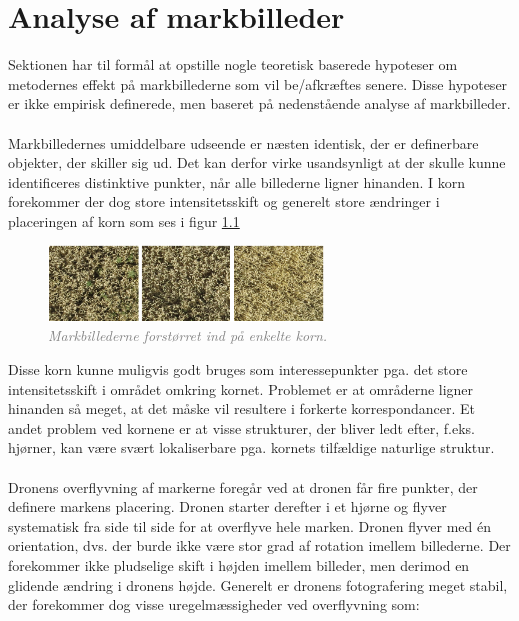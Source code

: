 \chapter{Analyse af markbilleder} \label{sec:mark}
Sektionen har til formål at opstille nogle teoretisk baserede hypoteser om metodernes effekt på markbillederne som vil be/afkræftes senere. Disse hypoteser er ikke empirisk definerede, men baseret på nedenstående analyse af markbilleder. \\ \\
Markbilledernes umiddelbare udseende er næsten identisk, der er definerbare objekter, der skiller sig ud. Det kan derfor virke usandsynligt at der skulle kunne identificeres distinktive punkter, når alle billederne ligner hinanden. I korn forekommer der dog store intensitetsskift og generelt store ændringer i placeringen af korn som ses i figur \ref{fig:korn}
\begin{figure}[H]
    \centering
    \includegraphics[width=0.65\textwidth]{fig/20.png}
     \vspace{-1em}
    \begin{center}    
       \caption{\textcolor{gray}{\footnotesize \textit{Markbillederne forstørret ind på enkelte korn.}}}
    \label{fig:korn}
     \end{center}
     \vspace{-2.5em}
  \end{figure} \noindent
Disse korn kunne muligvis godt bruges som interessepunkter pga. det store intensitetsskift i området omkring kornet. Problemet er at områderne ligner hinanden så meget, at det måske vil resultere i forkerte korrespondancer. Et andet problem ved kornene er at visse strukturer, der bliver ledt efter, f.eks. hjørner, kan være svært lokaliserbare pga. kornets tilfældige naturlige struktur. \\ \\
Dronens overflyvning af markerne foregår ved at dronen får fire punkter, der definere markens placering. Dronen starter derefter i et hjørne og flyver systematisk fra side til side for at overflyve hele marken. Dronen flyver med én orientation, dvs. der burde ikke være stor grad af rotation imellem billederne. Der forekommer ikke pludselige skift i højden imellem billeder, men derimod en glidende ændring i dronens højde. Generelt er dronens fotografering meget stabil, der forekommer dog visse uregelmæssigheder ved overflyvning som:
